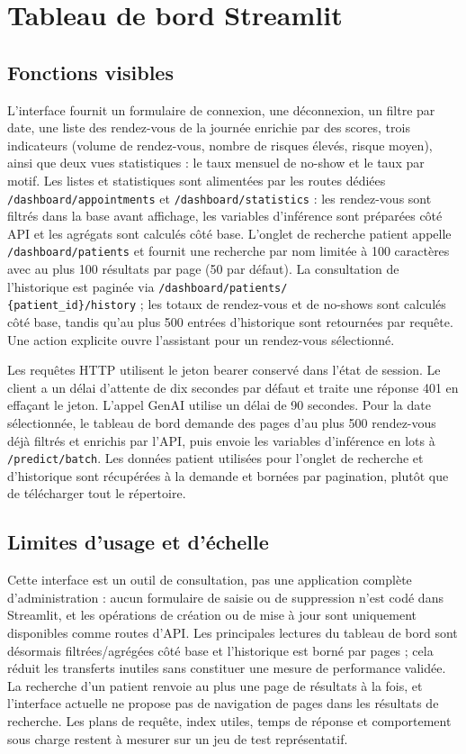 \documentclass[11pt,a4paper]{report}
\newcommand{\code}[1]{\texttt{#1}}
\begin{document}
\chapter{Tableau de bord Streamlit}
\section{Fonctions visibles}
L'interface fournit un formulaire de connexion, une déconnexion, un filtre
par date, une liste des rendez-vous de la journée enrichie par des scores,
trois indicateurs (volume de rendez-vous, nombre de risques élevés, risque
moyen), ainsi que deux vues statistiques : le taux mensuel de no-show et le
taux par motif. Les listes et statistiques sont alimentées par les routes
dédiées \code{/dashboard/appointments} et \code{/dashboard/statistics} :
les rendez-vous sont filtrés dans la base avant affichage, les variables
d'inférence sont préparées côté API et les agrégats sont calculés côté base.
L'onglet de recherche patient appelle \code{/dashboard/patients} et fournit
une recherche par nom limitée à 100 caractères avec au plus 100 résultats
par page (50 par défaut). La consultation de l'historique est paginée via
\code{/dashboard/patients/}\\\code{\{patient\_id\}/history} ; les totaux de rendez-vous
et de no-shows sont calculés côté base, tandis qu'au plus 500 entrées
d'historique sont retournées par requête. Une action explicite ouvre
l'assistant pour un rendez-vous sélectionné.

Les requêtes HTTP utilisent le jeton bearer conservé dans l'état de session.
Le client a un délai d'attente de dix secondes par défaut et traite une
réponse 401 en effaçant le jeton. L'appel GenAI utilise un délai de 90 secondes.
Pour la date sélectionnée, le tableau de bord demande des pages d'au plus 500
rendez-vous déjà filtrés et enrichis par l'API, puis envoie les variables
d'inférence en lots à \code{/predict/batch}. Les données patient utilisées
pour l'onglet de recherche et d'historique sont récupérées à la demande et
bornées par pagination, plutôt que de télécharger tout le répertoire.

\section{Limites d'usage et d'échelle}
Cette interface est un outil de consultation, pas une application complète
d'administration : aucun formulaire de saisie ou de suppression n'est codé
dans Streamlit, et les opérations de création ou de mise à jour sont
uniquement disponibles comme routes d'API. Les principales lectures du
tableau de bord sont désormais filtrées/agrégées côté base et l'historique est
borné par pages ; cela réduit les transferts inutiles sans constituer une
mesure de performance validée. La recherche d'un patient renvoie au plus une
page de résultats à la fois, et l'interface actuelle ne propose pas de
navigation de pages dans les résultats de recherche. Les plans de requête,
index utiles, temps de réponse et comportement sous charge restent à mesurer
sur un jeu de test représentatif.
\end{document}

